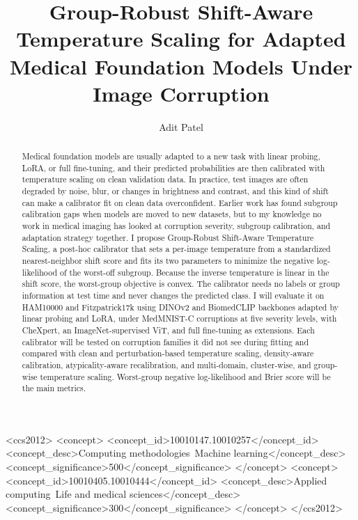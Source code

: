 \documentclass[sigconf,nonacm]{acmart}
\begin{document}
\title{Group-Robust Shift-Aware Temperature Scaling for Adapted Medical
  Foundation Models Under Image Corruption}

\author{Adit Patel}

\renewcommand{\shortauthors}{Patel}

\begin{abstract}
Medical foundation models are usually adapted to a new task with linear
probing, LoRA, or full fine-tuning, and their predicted probabilities are
then calibrated with temperature scaling on clean validation data. In
practice, test images are often degraded by noise, blur, or changes in
brightness and contrast, and this kind of shift can make a calibrator fit on
clean data overconfident. Earlier work has found subgroup calibration gaps
when models are moved to new datasets, but to my knowledge no work in
medical imaging has looked at corruption severity, subgroup calibration, and
adaptation strategy together. I propose Group-Robust Shift-Aware
Temperature Scaling, a post-hoc calibrator that sets a per-image temperature
from a standardized nearest-neighbor shift score and fits its two parameters
to minimize the negative log-likelihood of the worst-off subgroup. Because the
inverse temperature is linear in the shift score, the worst-group objective is
convex. The calibrator needs no labels or group information at test time and
never changes the predicted class. I will evaluate it on HAM10000 and
Fitzpatrick17k using DINOv2 and BiomedCLIP backbones adapted by linear probing
and LoRA, under MedMNIST-C corruptions at five severity levels, with CheXpert,
an ImageNet-supervised ViT, and full fine-tuning as extensions. Each
calibrator will be tested on corruption families it did not see during fitting
and compared with clean and perturbation-based temperature scaling,
density-aware calibration, atypicality-aware recalibration, and multi-domain,
cluster-wise, and group-wise temperature scaling. Worst-group negative
log-likelihood and Brier score will be the main metrics.
\end{abstract}

\begin{CCSXML}
<ccs2012>
 <concept>
  <concept_id>10010147.10010257</concept_id>
  <concept_desc>Computing methodologies~Machine learning</concept_desc>
  <concept_significance>500</concept_significance>
 </concept>
 <concept>
  <concept_id>10010405.10010444</concept_id>
  <concept_desc>Applied computing~Life and medical sciences</concept_desc>
  <concept_significance>300</concept_significance>
 </concept>
</ccs2012>
\end{CCSXML}
\end{document}
